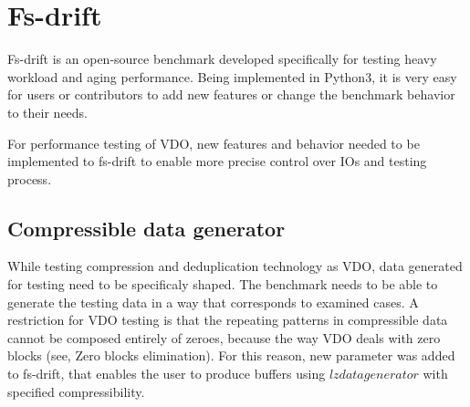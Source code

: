 \documentclass[
  color, %
  table, %
  lof,   %
  lot,   %
]{fithesis3}
\begin{document}



\chapter{Fs-drift}
\label{fs-drift}

Fs-drift is an open-source benchmark developed specifically for testing heavy workload and aging performance. Being implemented in Python3, it is very easy for users or contributors to add new features or change the benchmark behavior to their needs.

For performance testing of VDO, new features and behavior needed to be implemented to fs-drift to enable more precise control over IOs and testing process.

\section{Compressible data generator}
While testing compression and deduplication technology as VDO, data generated for testing need to be specificaly shaped. The benchmark needs to be able to generate the testing data in a way that corresponds to examined cases. A restriction for VDO testing is that the repeating patterns in compressible data cannot be composed entirely of zeroes, because the way VDO deals with zero blocks (see, Zero blocks elimination). For this reason, new parameter was added to fs-drift, that enables the user to produce buffers using $lzdatagenerator$ with specified compressibility.
\end{document}
